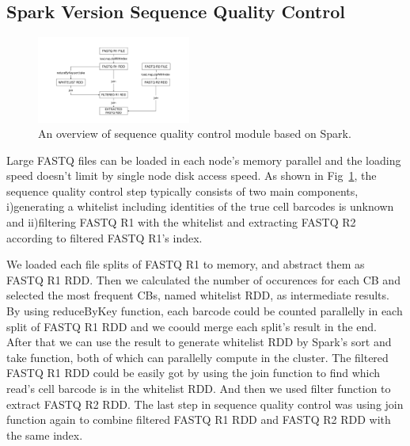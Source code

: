 \documentclass[10pt,journal,compsoc]{IEEEtran}
\begin{document}
\subsection{Spark Version Sequence Quality Control}
\begin{figure}
	\includegraphics[width=0.45\textwidth]{fig1.pdf}
	\caption{An overview of sequence quality control module based on Spark.} \label{fig1}
\end{figure}  
Large FASTQ files can be loaded in each node's memory parallel and the loading speed doesn't limit by single node disk access speed. 
As shown in Fig~\ref{fig1}, the sequence quality control step typically consists of two main components, i)generating a whitelist including identities of the true cell barcodes is unknown and ii)filtering FASTQ R1 with the whitelist and extracting FASTQ R2 according to filtered FASTQ R1's index.

We loaded each file splits of FASTQ R1 to memory, and abstract them as FASTQ R1 RDD. 
Then we calculated the number of occurences for each CB and selected the most frequent CBs, named whitelist RDD, as intermediate results. 
By using reduceByKey function, each barcode could be counted parallelly in each split of FASTQ R1 RDD and we coould merge each split's result in the end. 
After that we can use the result to generate whitelist RDD by Spark's sort and take function, both of which can parallelly compute in the cluster. 
The filtered FASTQ R1 RDD could be easily got by using the join function to find which read's cell barcode is in the whitelist RDD. 
And then we used filter function to extract FASTQ R2 RDD. 
The last step in sequence quality control was using join function again to combine filtered FASTQ R1 RDD and FASTQ R2 RDD with the same index. 
\end{document}
